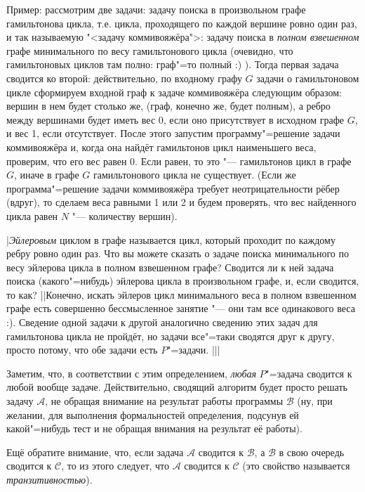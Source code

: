 \documentclass[a4paper,10pt]{problems}
\newcommand{\A}{{\ensuremath{\mathcal{A}}}}
\newcommand{\B}{{\ensuremath{\mathcal{B}}}}
\newcommand{\CC}{{\ensuremath{\mathcal{C}}}}
\begin{document}
Пример: рассмотрим две задачи: задачу поиска в произвольном графе гамильтонова 
цикла, т.е. цикла, проходящего по каждой вершине ровно один раз, и так 
называемую "<задачу коммивояжёра">: задачу поиска в \textit{полном взвешенном} 
графе минимального по весу гамильтонового цикла (очевидно, что гамильтоновых циклов 
там полно: граф"=то полный :) ). Тогда первая задача сводится ко второй: 
действительно, по входному графу $G$ задачи о гамильтоновом цикле сформируем 
входной граф к задаче коммивояжёра следующим образом: вершин в нем будет столько же, (граф, 
конечно же, будет полным), а ребро между вершинами будет иметь вес 0, если оно 
присутствует в исходном графе $G$, и вес 1, если отсутствует. После этого 
запустим программу"=решение задачи коммивояжёра и, когда она найдёт гамильтонов 
цикл наименьшего веса, проверим, что его вес равен 0. Если равен, то это "--- 
гамильтонов цикл в графе $G$, иначе в графе $G$ гамильтонового цикла не 
существует. (Если же программа"=решение задачи коммивояжёра требует 
неотрицательности рёбер (вдруг), то сделаем веса равными 1 или 2 и будем 
проверять, что вес найденного цикла равен $N$ "--- количеству вершин).

\task|\textit{Эйлеровым} циклом в графе называется цикл, 
который проходит по каждому ребру ровно один раз. Что вы можете сказать о 
задаче поиска минимального по весу эйлерова цикла в полном взвешенном графе? 
Сводится ли к ней задача поиска (какого"=нибудь) эйлерова цикла в произвольном 
графе, и, если сводится, то как?
||Конечно, искать эйлеров цикл минимального веса в 
полном взвешенном графе есть совершенно бессмысленное занятие "--- они там все 
одинакового веса :). Сведение одной задачи к другой аналогично сведению этих 
задач для гамильтонова цикла не пройдёт, но задачи все"=таки сводятся друг к другу, 
просто потому, что обе задачи есть $P$"=задачи.
|||


Заметим, что, в соответствии с этим определением, \textit{любая} $P$"=задача 
сводится к любой вообще задаче. Действительно, сводящий алгоритм будет просто решать задачу 
\A, не обращая внимание на результат работы программы \B{} (ну, при желании, 
для выполнения формальностей определения, подсунув ей какой"=нибудь тест и не 
обращая внимания на результат её работы).

Ещё обратите внимание, что, если задача \A{} сводится к \B, а \B{} в свою 
очередь сводится к \CC, то из этого следует, что \A{} сводится к \CC{} (это 
свойство называется \textit{транзитивностью}).
\end{document}
